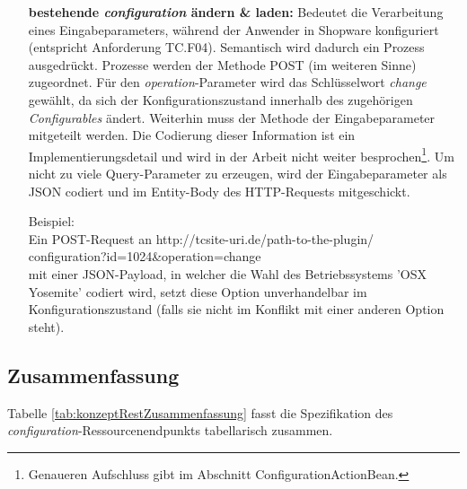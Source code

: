 \documentclass[11pt, a4paper, titlepage, listof=totoc, bibliography=totoc, index=totoc, twoside, openright, headings=normal]{scrreprt}
\begin{document}
\begin{enumerate}
\begin{addmargin}[25pt]{0pt}
Beispiel:\\
Ein POST-Request an \glqq http://tcsite-uri.de/path-to-the-plugin/
\\configuration?id=1024\&operation=copy\grqq{}
\\kopiert die \emph{Quotation} mit der ID 1024.
\end{addmargin}
\item[\textbf{bestehende \emph{configuration} ändern \& laden:}] Bedeutet die Verarbeitung eines Eingabeparameters, während der Anwender in Shopware konfiguriert (entspricht Anforderung TC.F04). Semantisch wird dadurch ein Prozess ausgedrückt. Prozesse werden der Methode POST (im weiteren Sinne) zugeordnet. Für den \emph{operation}-Parameter wird das Schlüsselwort \emph{change} gewählt, da sich der Konfigurationszustand innerhalb des zugehörigen \emph{Configurables} ändert. Weiterhin muss der Methode der Eingabeparameter mitgeteilt werden. Die Codierung dieser Information ist ein Implementierungsdetail und wird in der Arbeit nicht weiter besprochen\footnote{Genaueren Aufschluss gibt \citet{tactonTCsiteDevelopmentManual} im Abschnitt \glqq ConfigurationActionBean\grqq{}.}. Um nicht zu viele Query-Parameter zu erzeugen, wird der Eingabeparameter als JSON codiert und im Entity-Body des HTTP-Requests mitgeschickt.
\begin{addmargin}[25pt]{0pt} 
Beispiel:\\
Ein POST-Request an \glqq http://tcsite-uri.de/path-to-the-plugin/
\\configuration?id=1024\&operation=change\grqq{}
\\mit einer JSON-Payload, in welcher die Wahl des Betriebssystems 'OSX Yosemite' codiert wird, setzt diese Option unverhandelbar im Konfigurationszustand (falls sie nicht im Konflikt mit einer anderen Option steht).
\end{addmargin}
\end{enumerate}

\subsection{Zusammenfassung}
Tabelle \ref{tab:konzeptRestZusammenfassung} fasst die Spezifikation des  \emph{configuration}-Ressourcenendpunkts tabellarisch zusammen.
\end{document}
